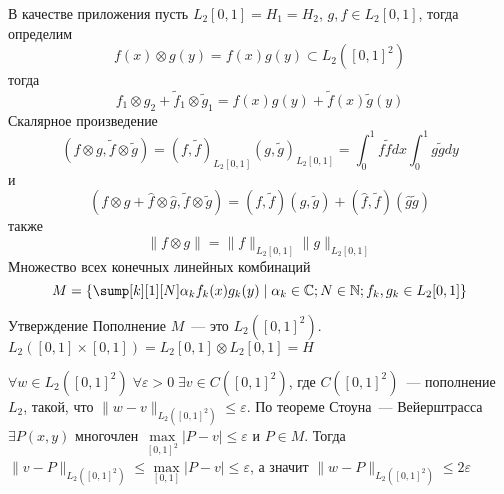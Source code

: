 \documentclass[14pt]{extarticle}
\begin{document}
В качестве приложения пусть $L_2[0,1] = H_1 = H_2$, $g, f \in L_2[0,1]$, тогда
определим
$$
f(x) \otimes g(y) = f(x)g(y) \subset L_2([0,1]^2)
$$
тогда 
$$
f_1 \otimes g_2 + \tilde{f}_1 \otimes \tilde{g}_1 = f(x)g(y) + \tilde{f}(x)\tilde{g}(y)
$$
Скалярное произведение
$$
(f \otimes g, \tilde{f} \otimes \tilde{g}) = (f, \tilde{f})_{L_2[0,1]}(g, \tilde{g})_{L_2[0,1]}
= \int_0^1f\tilde{f}dx\int_0^1g\tilde{g}dy
$$
и
$$
(f \otimes g + \hat{f} \otimes \hat{g}, \tilde{f} \otimes \tilde{g}) = 
(f, \tilde{f})(g, \tilde{g}) + (\hat{f},\tilde{f})(\hat{g}\tilde{g})
$$
также
$$
\|f \otimes g\| = \|f\|_{L_2[0,1]}\|g\|_{L_2[0,1]}
$$
Множество всех конечных линейных комбинаций
$$
M = \{\sump[k][1][N] \alpha_k f_k(x) g_k(y) \mid \alpha_k \in \mathbb C; N \in 
\mathbb N; f_k,g_k \in L_2[0,1]\}
$$
\begin{MathCl}{Утверждение}
    Пополнение $M$~--- это $L_2([0,1]^2)$.
    $L_2([0,1] \times [0,1]) = L_2[0,1] \otimes L_2[0,1] = H$
\end{MathCl}
\begin{Proof}
    $\forall w \in L_2([0,1]^2)\;\forall \varepsilon > 0\; \exists v \in C([0,1]^2)$, где 
    $C([0,1]^2)$~--- пополнение $L_2$, такой, что $\|w - v\|_{L_2([0,1]^2)} \le 
    \varepsilon$.
    По теореме Стоуна~--- Вейерштрасса $\exists P(x,y)$ многочлен $\max \limits_
    {[0,1]^2}|P - v| \le \varepsilon$ и $P \in M$.
    Тогда $\|v - P\|_{L_2([0,1]^2)} \le \max \limits_
    {[0,1]}|P - v| \le \varepsilon$, а значит $\|w - P\|_{L_2([0,1]^2)} \le 2\varepsilon$
\end{Proof}
\end{document}
